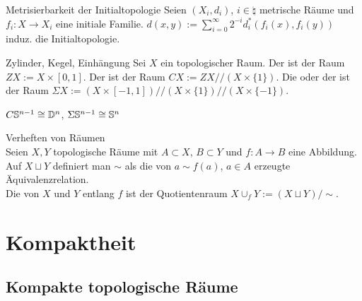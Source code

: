 \begin{Satz}{Metrisierbarkeit der Initialtopologie}
    Seien $(X_i, d_i)$, $i \in \natural$ metrische Räume und \\
    $f_i\colon X \rightarrow X_i$ eine initiale Familie.
    $d(x, y) := \sum_{i=0}^\infty 2^{-i} d_i^\ast(f_i(x), f_i(y))$ induz.
    die Initialtopologie.
\end{Satz}

\linie

\begin{Def}{Zylinder, Kegel, Einhängung}
    Sei $X$ ein topologischer Raum.
    Der  ist der Raum $ZX := X \times [0,1]$.
    Der  ist der Raum
    $CX := ZX/\!/(X \times \{1\})$.
    Die  oder der  ist der Raum
    $\Sigma X := (X \times [-1,1])/\!/(X \times \{1\})/\!/(X \times \{-1\})$.
\end{Def}

\begin{Bsp}
    $C \mathbb{S}^{n-1} \cong \mathbb{D}^n$,
    $\Sigma \mathbb{S}^{n-1} \cong \mathbb{S}^n$
\end{Bsp}

\begin{Def}{Verheften von Räumen}\\
    Seien $X, Y$ topologische Räume  mit $A \subset X$, $B \subset Y$ und
    $f\colon A \rightarrow B$ eine Abbildung. \\
    Auf $X \sqcup Y$ definiert man $\sim$ als die von $a \sim f(a)$, $a \in A$
    erzeugte Äquivalenzrelation. \\
    Die  von $X$ und $Y$ entlang $f$ ist der Quotientenraum
    $X \cup_f Y := (X \sqcup Y)/\sim$.
\end{Def}

\pagebreak

\section{%
    Kompaktheit%
}

\subsection{%
    Kompakte topologische Räume%
}

